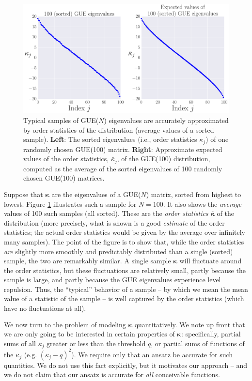 \documentclass[aps,pra, twocolumn]{revtex4-1}
\newcommand{\bvec}[1]{\boldsymbol{#1}}
\begin{document}
\begin{figure}[h!]
\includegraphics[width=\columnwidth]{Images/Figure_3.pdf}
\caption{Typical samples of GUE($N$) eigenvalues are accurately approximated by order statistics of the distribution (average values of a sorted sample).  \textbf{Left}:  The sorted eigenvalues (i.e., order statistics $\kappa_{j}$) of one randomly chosen GUE(100) matrix.  \textbf{Right}:  Approximate expected values of the order statistics, $\bar{\kappa}_{j}$, of the GUE(100) distribution, computed as the average of the sorted eigenvalues of 100 randomly chosen GUE(100) matrices.}
\label{fig:orderstatistics1}
\end{figure}

Suppose that $\bvec{\kappa}$ are the eigenvalues of a GUE($N$) matrix, sorted from highest to lowest.  Figure \ref{fig:orderstatistics1} illustrates such a sample for $N=100$.  It also shows the \emph{average} values of 100 such samples (all sorted).  These are the \emph{order statistics} $\overline{\bvec{\kappa}}$ of the distribution (more precisely, what is shown is a good \emph{estimate} of the order statistics; the actual order statistics would be given by the average over infinitely many samples).  The point of the figure is to show that, while the order statistics \emph{are} slightly more smoothly and predictably distributed than a single (sorted) sample, the two are remarkably similar.  A single sample $\bvec{\kappa}$ will fluctuate around the order statistics, but these fluctuations are relatively small, partly because the sample is large, and partly because the GUE eigenvalues experience level repulsion.  Thus, the ``typical'' behavior of a sample -- by which we mean the mean value of a statistic of the sample -- is well captured by the order statistics (which have no fluctuations at all).

We now turn to the problem of modeling $\bvec{\kappa}$ quantitatively.  We note up front that we are only going to be interested in certain properties of $\bvec{\kappa}$:  specifically, partial sums of all $\kappa_j$ greater or less than the threshold $q$, or partial sums of functions of the $\kappa_j$ (e.g. $(\kappa_j-q)^2$).  We require only that an ansatz be accurate for such quantities.  We do not use this fact explicitly, but it motivates our approach -- and we do not claim that our ansatz is accurate for \emph{all} conceivable functions.
\end{document}

